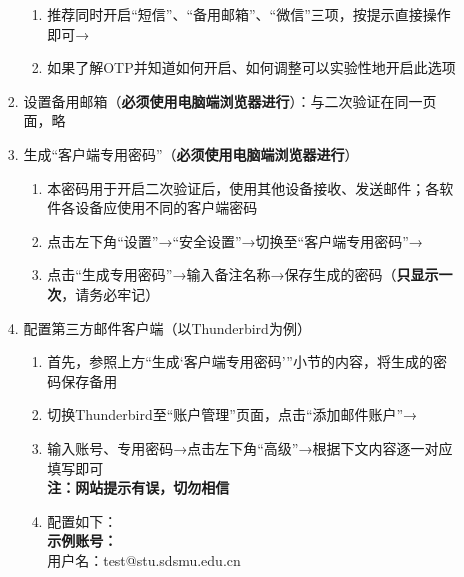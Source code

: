\begin{enumerate}
\begin{enumerate}
\begin{enumerate}
\begin{enumerate}
                                  \item 推荐同时开启“短信”、“备用邮箱”、“微信”三项，按提示直接操作即可→
                                  \item 如果了解OTP并知道如何开启、如何调整可以实验性地开启此选项
                              \end{enumerate}
                        \item 设置备用邮箱（\textbf{必须使用电脑端浏览器进行}）：与二次验证在同一页面，略
                        \item 生成“客户端专用密码”（\textbf{必须使用电脑端浏览器进行}）
                              \begin{enumerate}
                                  \item 本密码用于开启二次验证后，使用其他设备接收、发送邮件；各软件各设备应使用不同的客户端密码
                                  \item 点击左下角“设置”→“安全设置”→切换至“客户端专用密码”→
                                  \item 点击“生成专用密码”→输入备注名称→保存生成的密码（\textbf{只显示一次}，请务必牢记）
                              \end{enumerate}
                        \item 配置第三方邮件客户端（以Thunderbird为例\footnotemark）
                              \begin{enumerate}
                                  \item 首先，参照上方“生成‘客户端专用密码’”小节的内容，将生成的密码保存备用
                                  \item 切换Thunderbird至“账户管理”页面，点击“添加邮件账户”→
                                  \item 输入账号、专用密码→点击左下角“高级”→根据下文内容逐一对应填写即可\\
                                        \textbf{注：网站提示有误，切勿相信}
                                  \item 配置如下：\\
                                        \textbf{示例账号：}\\
                                        用户名：test@stu.sdsmu.edu.cn\\

\end{enumerate}
\end{enumerate}
\end{enumerate}
\end{enumerate}
